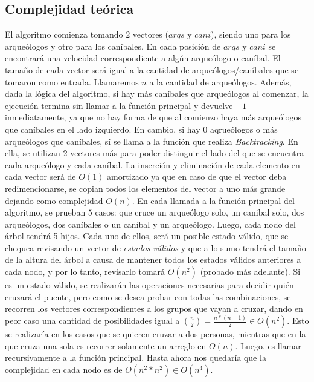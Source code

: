     \subsection{Complejidad teórica}

      El algoritmo comienza tomando $2$ vectores ($arqs$ y $cani$), siendo uno para los arqueólogos y otro para los caníbales. En cada posición de $arqs$ y $cani$ se encontrará una velocidad correspondiente a algún arqueólogo o caníbal. El tamaño de cada vector será igual a la cantidad de arqueólogos/caníbales que se tomaron como entrada. Llamaremos $n$ a la cantidad de arqueólogos. Además, dada la lógica del algoritmo, si hay más caníbales que arqueólogos al comenzar, la ejecución termina sin llamar a la función principal y devuelve $-1$ inmediatamente, ya que no hay forma de que al comienzo haya más arqueólogos que caníbales en el lado izquierdo. En cambio, si hay $0$ aqrueólogos o más arqueólogos que caníbales, sí se llama a la función que realiza \emph{Backtracking}.
      En ella, se utilizan $2$ vectores más para poder distinguir el lado del que se encuentra cada arqueólogo y cada caníbal. La inserción y eliminación de cada elemento en cada vector será de $O(1)$ amortizado ya que en caso de que el vector deba redimencionarse, se copian todos los elementos del vector a uno más grande dejando como complejidad $O(n)$.
      En cada llamada a la función principal del algoritmo, se prueban $5$ casos: que cruce un arqueólogo solo, un canibal solo, dos arqueólogos, dos caníbales o un caníbal y un arqueólogo. Luego, cada nodo del árbol tendrá 5 hijos. Cada uno de ellos, será un posible estado válido, que se chequea revisando un vector de \emph{estados válidos} y que a lo sumo tendrá el tamaño de la altura del árbol a causa de mantener todos los estados válidos anteriores a cada nodo, y por lo tanto, revisarlo tomará $O(n^2)$ (probado más adelante). Si es un estado válido, se realizarán las operaciones necesarias para decidir quién cruzará el puente, pero como se desea probar con todas las combinaciones, se recorren los vectores correspondientes a los grupos que vayan a cruzar, dando en peor caso una cantidad de posibilidades igual a $\binom{n}{2} = \frac{n*(n-1)}{2} \in O(n^2)$. Esto se realizaría en los casos que se quieren cruzar a dos personas, mientras que en la que cruza una sola es recorrer solamente un arreglo en $O(n)$. Luego, es llamar recursivamente a la función principal. Hasta ahora nos quedaría que la complejidad en cada nodo es de $O(n^2 * n^2) \in O(n^4)$.

